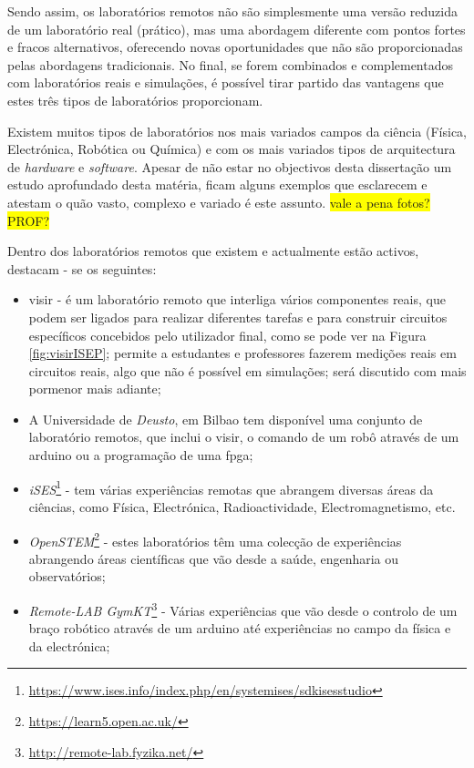 Sendo assim, os laboratórios remotos não são simplesmente uma versão reduzida de um laboratório real (prático), mas uma abordagem diferente com pontos fortes e fracos alternativos, oferecendo novas oportunidades que não são proporcionadas pelas abordagens tradicionais. No final, se forem combinados e complementados com laboratórios reais e simulações, é possível tirar partido das vantagens que estes três tipos de laboratórios proporcionam.

Existem muitos tipos de laboratórios nos mais variados campos da ciência (Física, Electrónica, Robótica ou Química) e com os mais variados tipos de arquitectura de \textit{hardware} e \textit{software}. Apesar de não estar no objectivos desta dissertação um estudo aprofundado desta matéria, ficam alguns exemplos que esclarecem e atestam o quão vasto, complexo e variado é este assunto.
\colorbox{yellow}{vale a pena fotos? PROF?}

Dentro dos laboratórios remotos que existem e actualmente estão activos, destacam - se os seguintes:
\begin{itemize}
    \item \acrshort{visir} - é um \acrshort{laboratório remoto} que interliga vários componentes reais, que podem ser ligados para realizar diferentes tarefas e para construir circuitos específicos concebidos pelo utilizador final, como se pode ver na Figura \ref{fig:visirISEP}; permite a estudantes e professores fazerem medições reais em circuitos reais, algo que não é possível em simulações; será discutido com mais pormenor mais adiante;
    \item A Universidade de \textit{Deusto}, em Bilbao tem disponível uma conjunto de \acrshort{laboratório remoto}s, que inclui o \acrshort{visir}, o comando de um robô através de um \gls{arduino} ou a programação de uma \acrfull{fpga};
    \item \textit{iSES}\footnote{\url{https://www.ises.info/index.php/en/systemises/sdkisesstudio}} - tem várias experiências remotas que abrangem diversas áreas da ciências, como Física, Electrónica, Radioactividade, Electromagnetismo, etc.
    \item \textit{OpenSTEM}\footnote{\url{https://learn5.open.ac.uk/}} - estes laboratórios têm uma colecção de experiências abrangendo áreas científicas que vão desde a saúde, engenharia ou observatórios;
    \item \textit{Remote-LAB GymKT}\footnote{\url{http://remote-lab.fyzika.net/}} - Várias experiências que vão desde o controlo de um braço robótico através de um \gls{arduino} até experiências no campo da física e da electrónica;
\end{itemize}

